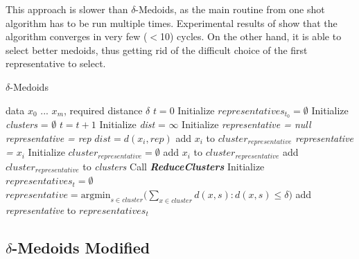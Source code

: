 \documentclass[thesis=B,english]{FITthesis}[2012/10/20]
\begin{document}
This approach is slower than $\delta$-Medoids, as the main routine from one shot algorithm has to be run multiple times.
Experimental results of \cite{liebman2015representative} show that the algorithm converges in very few ($<$10) cycles.
On the other hand, it is able to select better medoids, thus getting rid of the difficult choice of the first representative to select.

\begin{algorithm}
    \caption{$\delta$-Medoids}
    \label{alg:delta_medoids_full}
    \begin{algorithmic}[1]
        \INPUT data $x_0$ ... $x_m$, required distance $\delta$
        \STATE $t = 0$
        \STATE Initialize $representatives_{t_0} = \emptyset$
        \STATE Initialize \textit{clusters} = $\emptyset$
        \DO
            \STATE $t = t + 1$
                \STATE Initialize \textit{dist} = $\infty$
                \STATE Initialize \textit{representative = null}
                        \STATE \textit{representative = rep}
                        \STATE $dist = d(x_i, rep)$
                    \ENDIF
                \ENDFOR
                    \STATE add $x_i$ to $cluster_{representative}$
                \ELSE
                    \STATE \textit{representative = $x_i$}
                    \STATE Initialize $cluster_{representative} = \emptyset$
                    \STATE add $x_i$ to $cluster_{representative}$
                    \STATE add $cluster_{representative}$ to \textit{clusters}
                \ENDIF
            \ENDFOR
            \STATE Call \textbf{\textit{ReduceClusters}}
            \STATE Initialize $representatives_t = \emptyset$
                \STATE $representative = \textrm{argmin}_{s \in cluster} (\sum\limits_{x \in cluster}{d(x,s) : d(x,s) \le \delta)}$
                \STATE add \textit{representative} to $representatives_t$
            \ENDFOR
    \end{algorithmic}
\end{algorithm}

\subsection{$\delta$-Medoids Modified}
\label{sec:modified}
\end{document}
